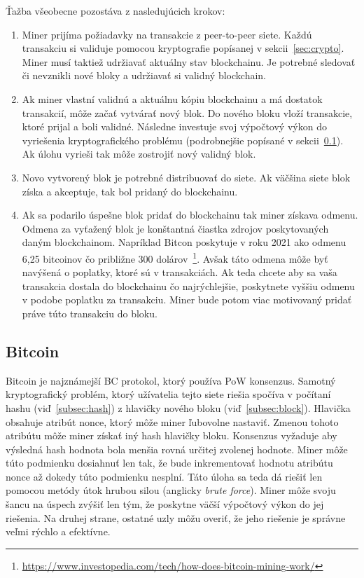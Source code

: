 Ťažba všeobecne pozostáva z nasledujúcich krokov:
\begin{enumerate}
	\item Miner prijíma požiadavky na transakcie z peer-to-peer siete. Každú transakciu si validuje pomocou kryptografie popísanej v sekcii~\ref{sec:crypto}. Miner musí taktiež udržiavať aktuálny stav blockchainu. Je potrebné sledovať či nevznikli nové bloky a udržiavať si validný blockchain.
	\item Ak miner vlastní validnú a aktuálnu kópiu blockchainu a má dostatok transakcií, môže začať vytvárať nový blok. Do nového bloku vloží transakcie, ktoré prijal a boli validné. Následne investuje svoj výpočtový výkon do vyriešenia kryptografického problému (podrobnejšie popísané v sekcii~\ref{subsec:bitcoin}). Ak úlohu vyrieši tak môže zostrojiť nový validný blok.
	\item Novo vytvorený blok je potrebné distribuovať do siete. Ak väčšina siete blok získa a akceptuje, tak bol pridaný do blockchainu.
	\item Ak sa podarilo úspešne blok pridať do blockchainu tak miner získava odmenu. Odmena za vyťažený blok je konštantná čiastka zdrojov poskytovaných daným blockchainom. Napríklad Bitcon poskytuje v roku 2021 ako odmenu 6,25 bitcoinov čo približne 300 dolárov~\footnote{\url{https://www.investopedia.com/tech/how-does-bitcoin-mining-work/}}. Avšak táto odmena môže byť navýšená o poplatky, ktoré sú v transakciách. Ak teda chcete aby sa vaša transakcia dostala do blockchainu čo najrýchlejšie, poskytnete vyššiu odmenu v podobe poplatku za transakciu. Miner bude potom viac motivovaný pridať práve túto transakciu do bloku.
\end{enumerate}

\subsection{Bitcoin}\label{subsec:bitcoin}
Bitcoin je najznámejší BC protokol, ktorý používa PoW konsenzus. Samotný kryptografický problém, ktorý užívatelia tejto siete riešia spočíva v počítaní hashu (viď~\ref{subsec:hash}) z hlavičky nového bloku (viď~\ref{subsec:block}). Hlavička obsahuje atribút nonce, ktorý môže miner ľubovolne nastaviť. Zmenou tohoto atribútu môže miner získať iný hash hlavičky bloku. Konsenzus vyžaduje aby výsledná hash hodnota bola menšia rovná určitej zvolenej hodnote. Miner môže túto podmienku dosiahnuť len tak, že bude inkrementovať hodnotu atribútu nonce až dokedy túto podmienku nesplní. Táto úloha sa teda dá riešiť len pomocou metódy útok hrubou silou (anglicky \textit{brute force}). Miner môže svoju šancu na úspech zvýšiť len tým, že poskytne väčší výpočtový výkon do jej riešenia. Na druhej strane, ostatné uzly môžu overiť, že jeho riešenie je správne veľmi rýchlo a efektívne.~\cite{zhengBlockchainOverview}

